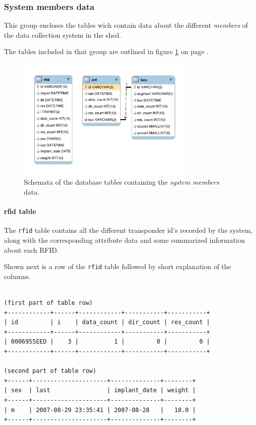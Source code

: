 \subsubsection{System members data}

This group encloses the tables wich contain data about the different \textit{members} of the data collection system in the shed.

The tables included in that group are outlined in figure \ref{fig:system_members} on page \pageref{fig:system_members}. 

\begin{figure}[htpb]
\begin{center}
  \includegraphics[width=0.75\textwidth]{assets/pdf/system_members_schema.pdf}
  \caption[Schema of database tables with system member data]{Schemata of the database tables containing the \textit{system members} data.}
  \label{fig:system_members}
\end{center}
\end{figure}

\paragraph{rfid table}
\label{para:rfid_table}

The \lstinline|rfid| table contains all the different transponder id's recorded by the system, along with the corresponding attribute data and some summarized information about each \ac{RFID}. 

Shown next is a row of the \lstinline|rfid| table followed by short explanation of the columns.
\codescript
\begin{lstlisting}[frame=none]

(first part of table row)
+------------+------+------------+-----------+-----------+
| id         | i    | data_count | dir_count | res_count |
+------------+------+------------+-----------+-----------+
| 0006955EED |    3 |          1 |         0 |         0 |
+------------+------+------------+-----------+-----------+

(second part of table row)
+------+---------------------+--------------+--------+
| sex  | last                | implant_date | weight |
+------+---------------------+--------------+--------+
| m    | 2007-08-29 23:35:41 | 2007-08-28   |   18.0 |
+------+---------------------+--------------+--------+

\end{lstlisting}


